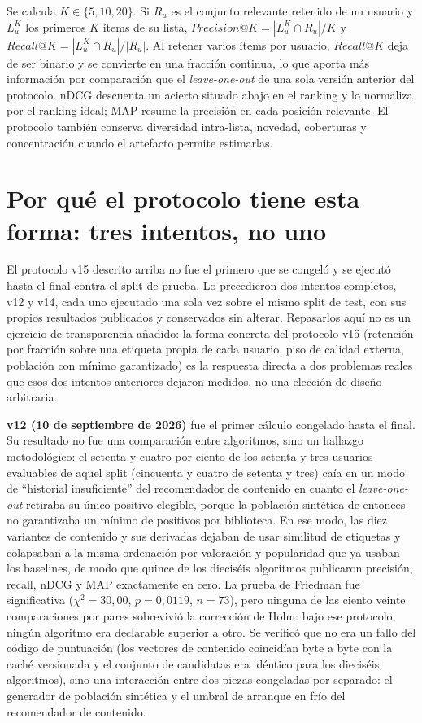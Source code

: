 Se calcula \(K\in\{5,10,20\}\). Si \(R_u\) es el conjunto relevante retenido de un usuario y
\(L_u^K\) los primeros \(K\) ítems de su lista, \(Precision@K=|L_u^K\cap R_u|/K\) y
\(Recall@K=|L_u^K\cap R_u|/|R_u|\). Al retener varios ítems por usuario, \(Recall@K\) deja de
ser binario y se convierte en una fracción continua, lo que aporta más información por
comparación que el \emph{leave-one-out} de una sola versión anterior del protocolo. nDCG
descuenta un acierto situado abajo en el ranking y lo normaliza por el ranking ideal; MAP
resume la precisión en cada posición relevante. El protocolo también conserva diversidad
intra-lista, novedad, coberturas y concentración cuando el artefacto permite estimarlas.

\section{Por qué el protocolo tiene esta forma: tres intentos, no uno}\label{sec:exp-evolucion}

El protocolo v15 descrito arriba no fue el primero que se congeló y se ejecutó hasta el final
contra el split de prueba. Lo precedieron dos intentos completos, v12 y v14, cada uno
ejecutado una sola vez sobre el mismo split de test, con sus propios resultados publicados y
conservados sin alterar. Repasarlos aquí no es un ejercicio de transparencia añadido: la forma
concreta del protocolo v15 (retención por fracción sobre una etiqueta propia de cada usuario,
piso de calidad externa, población con mínimo garantizado) es la respuesta directa a dos
problemas reales que esos dos intentos anteriores dejaron medidos, no una elección de diseño
arbitraria.

\textbf{v12 (10 de septiembre de 2026)} fue el primer cálculo congelado hasta el final. Su
resultado no fue una comparación entre algoritmos, sino un hallazgo metodológico: el
setenta y cuatro por ciento de los setenta y tres usuarios evaluables de aquel split
(cincuenta y cuatro de setenta y tres) caía en un modo de \enquote{historial insuficiente} del
recomendador de contenido en cuanto el \emph{leave-one-out} retiraba su único positivo
elegible, porque la población sintética de entonces no garantizaba un mínimo de positivos
por biblioteca. En ese modo, las diez variantes de contenido y sus derivadas dejaban de usar
similitud de etiquetas y colapsaban a la misma ordenación por valoración y popularidad que ya
usaban los baselines, de modo que quince de los dieciséis algoritmos publicaron precisión,
recall, nDCG y MAP exactamente en cero. La prueba de Friedman fue significativa
(\(\chi^2=30{,}00\), \(p=0{,}0119\), \(n=73\)), pero ninguna de las ciento veinte
comparaciones por pares sobrevivió la corrección de Holm: bajo ese protocolo, ningún
algoritmo era declarable superior a otro. Se verificó que no era un fallo del código de
puntuación (los vectores de contenido coincidían byte a byte con la caché versionada y el
conjunto de candidatas era idéntico para los dieciséis algoritmos), sino una interacción entre
dos piezas congeladas por separado: el generador de población sintética y el umbral de
arranque en frío del recomendador de contenido.

